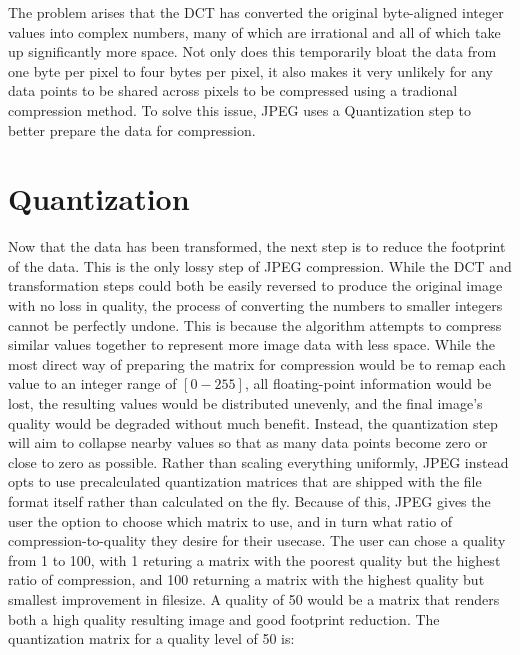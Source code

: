 \documentclass[11pt]{article}
\begin{document}
The problem arises that the DCT has converted the original byte-aligned integer values into complex numbers, many of which are irrational and all of which take up significantly more space.
Not only does this temporarily bloat the data from one byte per pixel to four bytes per pixel, it also makes it very unlikely for any data points to be shared across pixels to be compressed using a tradional compression method.
To solve this issue, JPEG uses a Quantization step to better prepare the data for compression.


\section{Quantization}
\label{sec: quantization}

Now that the data has been transformed, the next step is to reduce the footprint of the data.
This is the only lossy step of JPEG compression.
While the DCT and transformation steps could both be easily reversed to produce the original image with no loss in quality, the process of converting the numbers to smaller integers cannot be perfectly undone.
This is because the algorithm attempts to compress similar values together to represent more image data with less space.
While the most direct way of preparing the matrix for compression would be to remap each value to an integer range of $[0-255]$, all floating-point information would be lost, the resulting values would be distributed unevenly, and the final image's quality would be degraded without much benefit.
Instead, the quantization step will aim to collapse nearby values so that as many data points become zero or close to zero as possible.
Rather than scaling everything uniformly, JPEG instead opts to use precalculated quantization matrices that are shipped with the file format itself rather than calculated on the fly.
Because of this, JPEG gives the user the option to choose which matrix to use, and in turn what ratio of compression-to-quality they desire for their usecase.
The user can chose a quality from 1 to 100, with 1 returing a matrix with the poorest quality but the highest ratio of compression, and 100 returning a matrix with the highest quality but smallest improvement in filesize.
A quality of 50 would be a matrix that renders both a high quality resulting image and good footprint reduction.
The quantization matrix for a quality level of 50 is:
\end{document}
